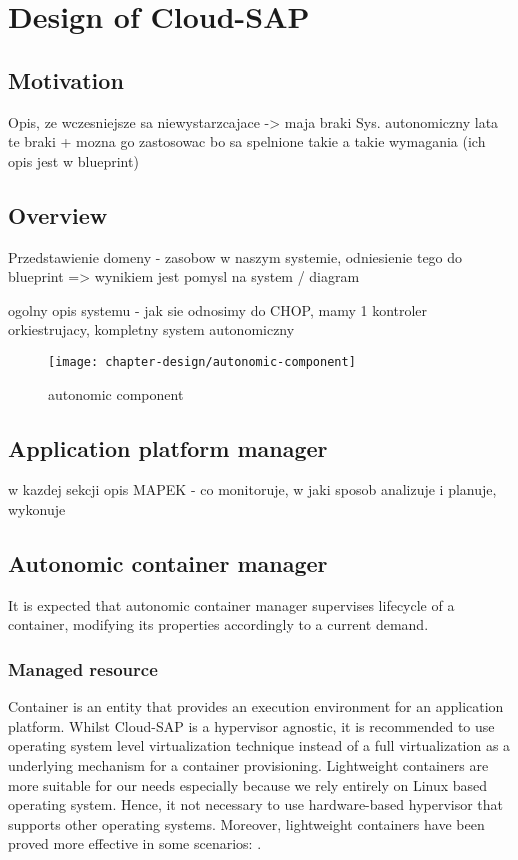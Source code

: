 \chapter{Design of Cloud-SAP}


\section{Motivation}
Opis, ze wczesniejsze sa niewystarzcajace -> maja braki
Sys. autonomiczny lata te braki + mozna go zastosowac bo sa spelnione takie a takie wymagania (ich opis jest w blueprint)

\section{Overview}
Przedstawienie domeny - zasobow w naszym systemie, odniesienie tego do blueprint => wynikiem jest pomysl na system / diagram

ogolny opis systemu - jak sie odnosimy do CHOP, mamy 1 kontroler orkiestrujacy, kompletny system autonomiczny

\begin{figure}[!ht]
  \begin{center}
    \texttt{[image: chapter-design/autonomic-component]}
  \end{center}
  \caption{autonomic component}
  \label{img:autonomic-component}
\end{figure}

\section{Application platform manager}
w kazdej sekcji opis MAPEK - co monitoruje, w jaki sposob analizuje i planuje, wykonuje

\section{Autonomic container manager}
It is expected that autonomic container manager supervises lifecycle of a container, modifying its properties accordingly to a current demand.

\subsection{Managed resource}
Container is an entity that provides an execution environment for an application platform. Whilst Cloud-SAP is a hypervisor agnostic, it is recommended to use operating system level virtualization technique instead of a full virtualization as a underlying mechanism for a container provisioning. Lightweight containers are more suitable for our needs especially because we rely entirely on Linux based operating system. Hence, it not necessary to use hardware-based hypervisor that supports other operating systems. Moreover, lightweight containers have been proved more effective in some scenarios: \cite{RaHiSj13}.


